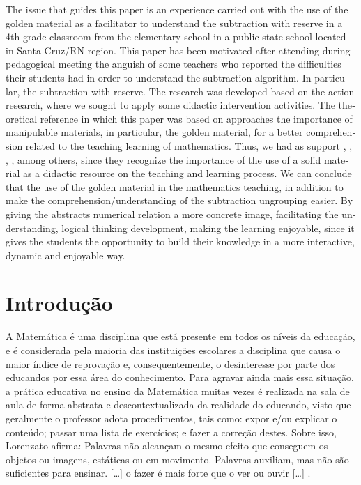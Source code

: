 \begin{refsection}
\begin{otherlanguage}{english}
    \begin{galoResumo}[Abstract]
        The issue that guides this paper is an experience carried out with the use of the golden material as a facilitator to understand the subtraction with reserve in a 4th grade classroom from the elementary school in a public state school located in Santa Cruz/RN region. This paper has been motivated after attending during pedagogical meeting the anguish of some teachers who reported the difficulties their students had in order to understand the subtraction algorithm. In particular, the subtraction with reserve. The research was developed based on the action research, where we sought to apply some didactic intervention activities. The theoretical reference in which this paper was based on approaches the importance of manipulable materials, in particular, the golden material, for a better comprehension related to the teaching learning of mathematics. Thus, we had as support \textcite{NACARATO2005trabalho}, \textcite{BERTONAndITACARAMBI2009Números}, \textcite{LORENZATO2006Começar}, \textcite{CENTURIÓN1995Números}, among others, since they recognize the importance of the use of a solid material as a didactic resource on the teaching and learning process. We can conclude that the use of the golden material in the mathematics teaching, in addition to make the comprehension/understanding of the subtraction ungrouping easier. By giving the abstracts numerical relation a more concrete image, facilitating the understanding, logical thinking development, making the learning enjoyable, since it gives the students the opportunity to build their knowledge in a more interactive, dynamic and enjoyable way. 
    \end{galoResumo}
    
    \end{otherlanguage}

    \section{Introdução}

    A Matemática é uma disciplina que está presente em todos os níveis da educação, e é considerada pela maioria das instituições escolares a disciplina que causa o maior índice de reprovação e, consequentemente, o desinteresse por parte dos educandos por essa área do conhecimento. Para agravar ainda mais essa situação, a prática educativa no ensino da Matemática muitas vezes é realizada na sala de aula de forma abstrata e descontextualizada da realidade do educando, visto que geralmente o professor adota procedimentos, tais como: expor e/ou explicar o conteúdo; passar uma lista de exercícios; e fazer a correção destes. Sobre isso, Lorenzato afirma: Palavras não alcançam o mesmo efeito que conseguem os objetos ou imagens, estáticas ou em movimento. Palavras auxiliam, mas não são suficientes para ensinar. [\dots] o fazer é mais forte que o ver ou ouvir [\dots] \cite[p.~17--18]{LORENZATO2006Começar}. 


\end{refsection}

